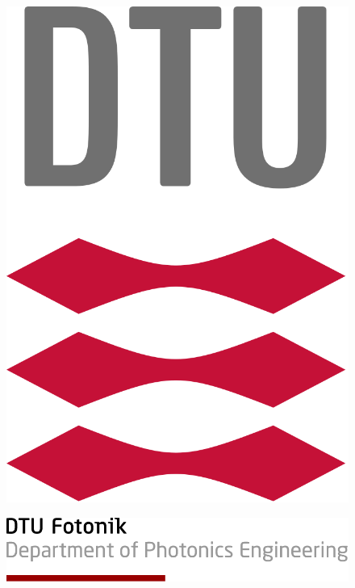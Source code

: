 \documentclass{memoir}
\title{
\noindent\makebox[\linewidth]{\rule{\textwidth}{1pt}} 
\textmd{\huge \textbf{\hmwkClass \\ \hmwkTitle}}\\
\large\vspace{0.1in}\hmwkDueDate\\
\vspace{0.1in}\large{\textit{\hmwkClassInstructor\ \hmwkClassTime}}
\noindent\makebox[\linewidth]{\rule{\textwidth}{1pt}} 
\vspace{1in}
}
\author{\large\textbf{\hmwkAuthorName}}
\date{} %
\begin{document}
\begin{figure}
	\centering
	\includegraphics[scale=0.15]{dtulogo.png}
\end{figure}

\begin{figure}[!b]
	\includegraphics[scale=0.25]{dtufooter.png}
\end{figure}
\maketitle
\thispagestyle{empty}
\end{document}

